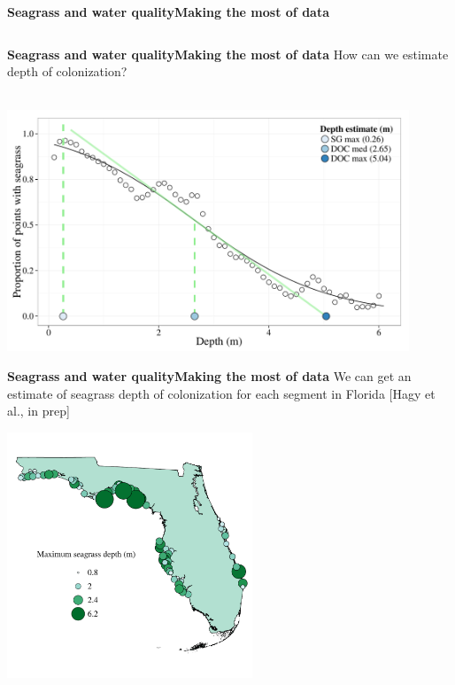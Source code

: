 \documentclass[serif]{beamer}\usepackage[]{graphicx}\usepackage[]{color}
\newenvironment{knitrout}{}{} %
\begin{document}
\begin{frame}{\textbf{Seagrass and water quality}}{\textbf{Making the most of data}}
\begin{columns}[T]
\begin{column}{0.32\textwidth}
\begin{knitrout}
{}



\end{knitrout}
\end{column}
\end{columns}
\end{frame}

\begin{frame}{\textbf{Seagrass and water quality}}{\textbf{Making the most of data}}
\onslide<+->
How can we estimate depth of colonization? \\~\\


{\centering \includegraphics[width=0.9\textwidth]{fig//sg_est_ex} 

}



\end{frame}



\begin{frame}{\textbf{Seagrass and water quality}}{\textbf{Making the most of data}}
We can get an estimate of seagrass depth of colonization for each segment in Florida \scriptsize [Hagy et al., in prep]
\vspace{-0.25in}
\centerline{\includegraphics[width = 0.55\textwidth]{fig/sgdepthall.pdf}}
\end{frame}
\end{document}
